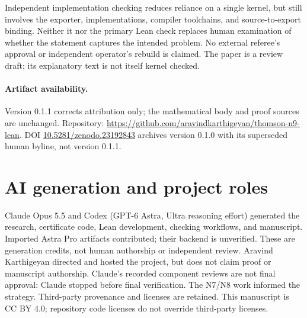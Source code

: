 \documentclass[11pt]{article}
\theoremstyle{remark}
\begin{document}
Independent implementation checking reduces reliance on a single kernel,
but still involves the exporter, implementations, compiler toolchains, and
source-to-export binding. Neither it nor the primary Lean check replaces
human examination of whether the statement captures the intended problem.
No external referee's approval or independent operator's rebuild is claimed.
The paper is a review draft; its explanatory text is not itself kernel checked.

\paragraph{Artifact availability.}
Version 0.1.1 corrects attribution only; the mathematical body and proof sources
are unchanged. Repository:
\url{https://github.com/aravindkarthigeyan/thomson-n9-lean}.
DOI \href{https://doi.org/10.5281/zenodo.23192843}{10.5281/zenodo.23192843}
archives version 0.1.0 with its superseded human byline, not version 0.1.1.

\section*{AI generation and project roles}
Claude Opus 5.5 and Codex (GPT-6 Astra, Ultra reasoning effort) generated the
research, certificate code, Lean development, checking workflows, and manuscript.
Imported Astra Pro artifacts contributed; their backend is unverified. These
are generation credits, not human authorship or independent review.
Aravind Karthigeyan directed and hosted the project, but does not claim proof
or manuscript authorship. Claude's recorded component reviews are not final
approval: Claude stopped before final verification. The N7/N8 work informed
the strategy. Third-party provenance and licenses are retained. This manuscript
is CC BY 4.0; repository code licenses do not override third-party licenses.
\end{document}
